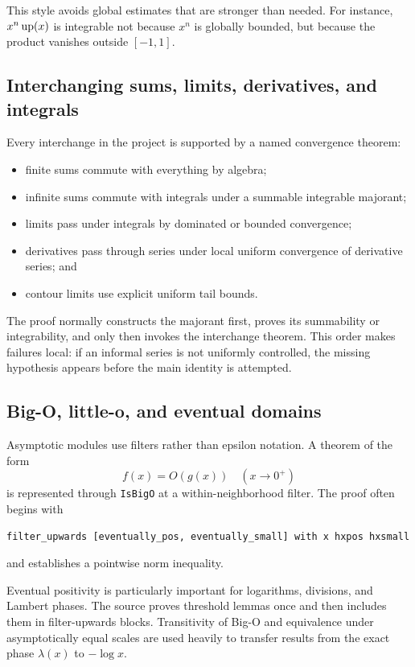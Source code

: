 \documentclass[11pt,oneside]{article}
\theoremstyle{definition}
\theoremstyle{remark}
\begin{document}
This style avoids global estimates that are stronger than needed.  For instance, \(x^n\operatorname{up}(x)\) is integrable not because \(x^n\) is globally bounded, but because the product vanishes outside \([-1,1]\).

\subsection{Interchanging sums, limits, derivatives, and integrals}
Every interchange in the project is supported by a named convergence theorem:
\begin{itemize}
  \item finite sums commute with everything by algebra;
  \item infinite sums commute with integrals under a summable integrable majorant;
  \item limits pass under integrals by dominated or bounded convergence;
  \item derivatives pass through series under local uniform convergence of derivative series; and
  \item contour limits use explicit uniform tail bounds.
\end{itemize}
The proof normally constructs the majorant first, proves its summability or integrability, and only then invokes the interchange theorem.  This order makes failures local: if an informal series is not uniformly controlled, the missing hypothesis appears before the main identity is attempted.

\subsection{Big-O, little-o, and eventual domains}
Asymptotic modules use filters rather than epsilon notation.  A theorem of the form
\[
  f(x)=O(g(x))\quad(x\to0^+)
\]
is represented through \nolinkurl{IsBigO} at a within-neighborhood filter.  The proof often begins with
\begin{lstlisting}[style=pseudo]
filter_upwards [eventually_pos, eventually_small] with x hxpos hxsmall
\end{lstlisting}
and establishes a pointwise norm inequality.

Eventual positivity is particularly important for logarithms, divisions, and Lambert phases.  The source proves threshold lemmas once and then includes them in filter-upwards blocks.  Transitivity of Big-O and equivalence under asymptotically equal scales are used heavily to transfer results from the exact phase \(\lambda(x)\) to \(-\log x\).
\end{document}
